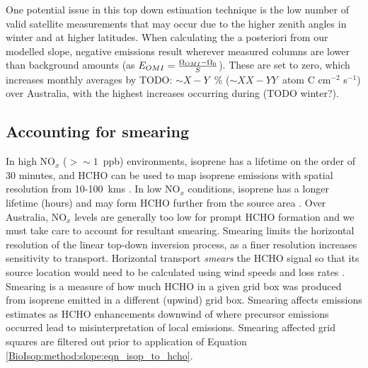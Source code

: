     
    One potential issue in this top down estimation technique is the low number of valid satellite measurements that may occur due to the higher zenith angles in winter and at higher latitudes.
    When calculating the a posteriori from our modelled slope, negative emissions result wherever measured columns are lower than background amounts (as $E_{OMI} = \frac{\Omega_{OMI} - \Omega_0}{S}$).
    These are set to zero, which increases monthly averages by TODO: $\sim X-Y$~\% ($\sim XX - YY$~atom C cm$^{-2}$ s$^{-1}$) over Australia, with the highest increases occurring during (TODO winter?).
    
  \subsection{Accounting for smearing}
    \label{BioIsop:method:smearing}
    
    In high NO$_x$ ($ > \sim 1 $~ppb) environments, isoprene has a lifetime on the order of 30 minutes, and HCHO can be used to map isoprene emissions with spatial resolution from 10-100~kms \parencite{Palmer2003}.
    In low NO$_x$ conditions, isoprene has a longer lifetime (hours) and may form HCHO further from the source area \parencite{Fan2004,Liu2016a,Liu2017_hpald}.
    Over Australia, NO$_x$ levels are generally too low for prompt HCHO formation and we must take care to account for resultant smearing.
    Smearing limits the horizontal resolution of the linear top-down inversion process, as a finer resolution increases sensitivity to transport.
    Horizontal transport \textit{smears} the HCHO signal so that its source location would need to be calculated using wind speeds and loss rates \parencite{Palmer2001,Palmer2003}.
    Smearing is a measure of how much HCHO in a given grid box was produced from isoprene emitted in a different (upwind) grid box.
    Smearing affects emissions estimates as HCHO enhancements downwind of where precursor emissions occurred lead to misinterpretation of local emissions.
    Smearing affected grid squares are filtered out prior to application of Equation \ref{BioIsop:method:slope:eqn_isop_to_hcho}.
    
    
    
